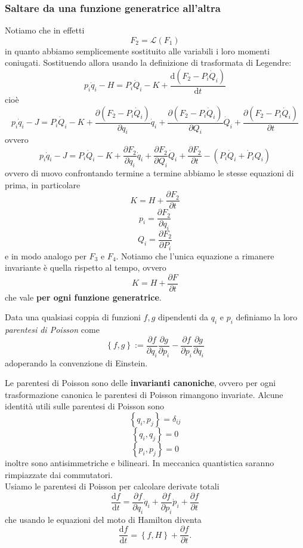 \documentclass[11pt]{scrartcl}
\newcommand{\dif}{\text{d}}
\begin{document}
	\subsubsection{Saltare da una funzione generatrice all'altra}
	Notiamo che in effetti
	$$F_2=\mathscr{L}(F_1)$$
	in quanto abbiamo semplicemente sostituito alle variabili i loro momenti coniugati. Sostituendo allora usando la definizione di trasformata di Legendre:
	$$p_i\dot{q}_i-H=P_i\dot{Q}_i-K+\frac{\dif\left(F_2-P_i\dot{Q}_i\right) }{\dif t}$$
	cioè 
	$$p_i\dot{q}_i-J=P_i\dot{Q}_i-K+\frac{\partial \left(F_2-P_i\dot{Q}_i\right)}{\partial q_i}\dot{q}_i+\frac{\partial \left(F_2-P_i\dot{Q}_i\right)}{\partial Q_i}\dot{Q}_i+\frac{\partial \left(F_2-P_i\dot{Q}_i\right)}{\partial t}$$
	ovvero
	$$p_i\dot{q}_i-J=P_i\dot{Q}_i-K+\frac{\partial F_2}{\partial q_i}\dot{q}_i+\frac{\partial F_2}{\partial Q_i}\dot{Q}_i+\frac{\partial F_2}{\partial t}-\left(P_i\dot{Q}_i+\dot{P}_iQ_i\right)$$
	ovvero di nuovo confrontando termine a termine abbiamo le stesse equazioni di prima, in particolare
	$$K=H+\frac{\partial F_2}{\partial t}$$
	$$p_i=\frac{\partial F_2}{\partial q_i}$$
	$$Q_i=\frac{\partial F_2}{\partial P_i}$$
	e in modo analogo per $F_3$ e $F_4$. Notiamo che l'unica equazione a rimanere invariante è quella rispetto al tempo, ovvero
	$$K=H+\frac{\partial F}{\partial t}$$
	che vale \textbf{per ogni funzione generatrice}. 
	\begin{definition}
		Data una qualsiasi coppia di funzioni $f,g$ dipendenti da $q_i$ e $p_i$ definiamo la loro \textit{parentesi di Poisson} come
		$$\left\{f,g\right\}:=\frac{\partial f}{\partial q_i}\frac{\partial g}{\partial p_i}-\frac{\partial f}{\partial p_i}\frac{\partial g}{\partial q_i}$$
		adoperando la convenzione di Einstein.
	\end{definition}
	Le parentesi di Poisson sono delle \textbf{invarianti canoniche}, ovvero per ogni trasformazione canonica le parentesi di Poisson rimangono invariate. Alcune identità utili sulle parentesi di Poisson sono
	$$\left\{q_i,p_j\right\}=\delta_{ij}$$
	$$\left\{q_i,q_j\right\}=0$$
	$$\left\{p_i,p_j\right\}=0$$
	inoltre sono antisimmetriche e bilineari. In meccanica quantistica saranno rimpiazzate dai commutatori. \\
	Usiamo le parentesi di Poisson per calcolare derivate totali
	$$\frac{\dif f}{\dif t}=\frac{\partial f}{\partial q_i}\dot{q}_i+\frac{\partial f}{\partial p_i}\dot{p}_i+\frac{\partial f}{\partial t}$$
	che usando le equazioni del moto di Hamilton diventa
	$$\frac{\dif f}{\dif t}=\left\{f,H\right\}+\frac{\partial f}{\partial t}.$$
\end{document}
